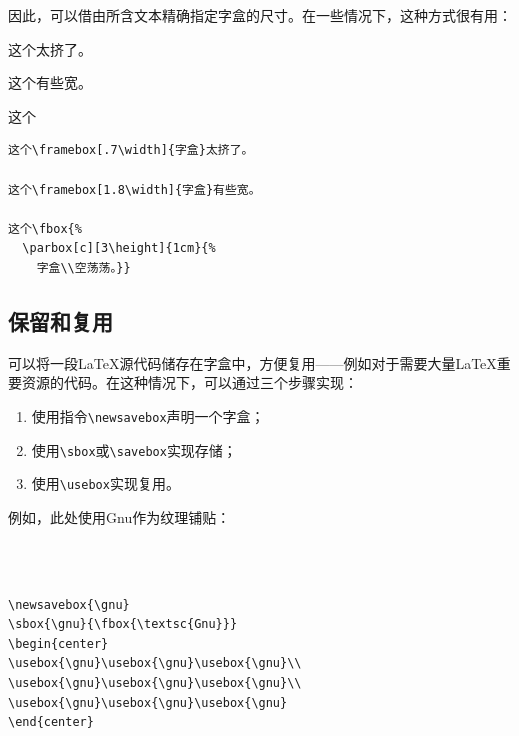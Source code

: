 因此，可以借由所含文本精确指定字盒的尺寸。在一些情况下，这种方式很有用：

\begin{codelist}[4.16]{
  这个太挤了。

  这个有些宽。
  
  这个
}\begin{verbatim}
这个\framebox[.7\width]{字盒}太挤了。

这个\framebox[1.8\width]{字盒}有些宽。

这个\fbox{%
  \parbox[c][3\height]{1cm}{%
    字盒\\空荡荡。}}
\end{verbatim}
\end{codelist}

\subsection{保留和复用}

可以将一段\LaTeX 源代码储存在字盒中，方便复用——例如对于需要大量\LaTeX 重要资源的代码。在这种情况下，可以通过三个步骤实现：

\begin{enumerate}
  \item 使用指令\verb|\newsavebox|声明一个字盒；
  \item 使用\verb|\sbox|或\verb|\savebox|实现存储；
  \item 使用\verb|\usebox|实现复用。
\end{enumerate}

例如，此处使用Gnu作为纹理铺贴：

\begin{codelist}[4.17]{
  \newsavebox{\gnu}
  \begin{center}
  \usebox{\gnu}\usebox{\gnu}\usebox{\gnu}\\
  \usebox{\gnu}\usebox{\gnu}\usebox{\gnu}\\
  \usebox{\gnu}\usebox{\gnu}\usebox{\gnu}
  \end{center}
}\begin{verbatim}
\newsavebox{\gnu}
\sbox{\gnu}{\fbox{\textsc{Gnu}}}
\begin{center}
\usebox{\gnu}\usebox{\gnu}\usebox{\gnu}\\
\usebox{\gnu}\usebox{\gnu}\usebox{\gnu}\\
\usebox{\gnu}\usebox{\gnu}\usebox{\gnu}
\end{center}
\end{verbatim}
\end{codelist}

